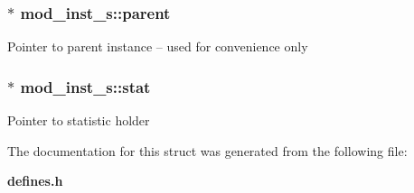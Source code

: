 \subsubsection{$\ast$ {\bf mod\_\-inst\_\-s::parent}}\label{structmod__inst__s_o5}


Pointer to parent instance -- used for convenience only 
\subsubsection{$\ast$ {\bf mod\_\-inst\_\-s::stat}}\label{structmod__inst__s_o2}


Pointer to statistic holder 

The documentation for this struct was generated from the following file:\begin{CompactItemize}
\item 
{\bf defines.h}\end{CompactItemize}
